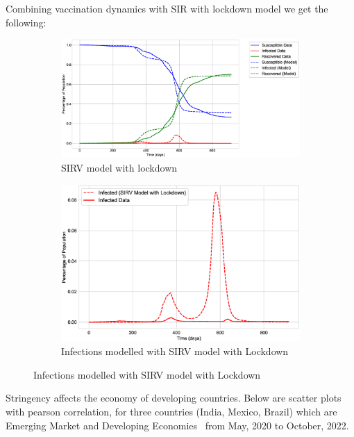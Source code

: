 \documentclass[tikz,fleqn,12pt]{wlscirep}
\begin{document}
Combining vaccination dynamics with SIR with lockdown model we get the following:
\begin{figure}[H]
  \centering
  \caption{SIRV Model with lockdown for India}
  \begin{subfigure}[t]{0.48\textwidth}
    \centering
    \includegraphics[width=\linewidth]{images/SIRV_model_with_lockdown_IND.eps}
    \caption{SIRV model with lockdown}
  \end{subfigure}
  \label{fig:SIRV_model_with_lockdown_IND}
  \hfill
  \begin{subfigure}[t]{0.48\textwidth}
    \centering
    \includegraphics[scale=0.25]{images/SIRV_model_with_lockdown_infections_IND.eps}
    \caption{Infections modelled with SIRV model with Lockdown}
  \end{subfigure}
  \label{fig:SIRV_model_with_lockdown_infections_IND}
\end{figure}

Stringency affects the economy of developing countries. Below are scatter plots with pearson correlation, for three countries (India, Mexico, Brazil) which are Emerging Market and Developing Economies~\cite{IMFCovid} from May, 2020 to October, 2022.
\end{document}
